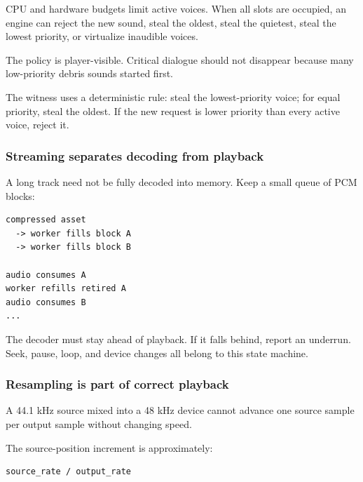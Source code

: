 \hypertarget{05-engine-i-ch009-voice-capacity-needs-an-overload-rule}{}

CPU and hardware budgets limit active voices. When all slots are occupied, an engine can reject the new sound, steal the oldest, steal the quietest, steal the lowest priority, or virtualize inaudible voices.

The policy is player-visible. Critical dialogue should not disappear because many low-priority debris sounds started first.

The witness uses a deterministic rule: steal the lowest-priority voice; for equal priority, steal the oldest. If the new request is lower priority than every active voice, reject it.

\subsubsection{Streaming separates decoding from playback}\label{05-engine-i-ch009-streaming-separates-decoding-from-playback}

\hypertarget{05-engine-i-ch009-streaming-separates-decoding-from-playback}{}

A long track need not be fully decoded into memory. Keep a small queue of PCM blocks:

\begin{verbatim}
compressed asset
  -> worker fills block A
  -> worker fills block B

audio consumes A
worker refills retired A
audio consumes B
...
\end{verbatim}

The decoder must stay ahead of playback. If it falls behind, report an underrun. Seek, pause, loop, and device changes all belong to this state machine.

\subsubsection{Resampling is part of correct playback}\label{05-engine-i-ch009-resampling-is-part-of-correct-playback}

\hypertarget{05-engine-i-ch009-resampling-is-part-of-correct-playback}{}

A 44.1 kHz source mixed into a 48 kHz device cannot advance one source sample per output sample without changing speed.

The source-position increment is approximately:

\begin{verbatim}
source_rate / output_rate
\end{verbatim}

